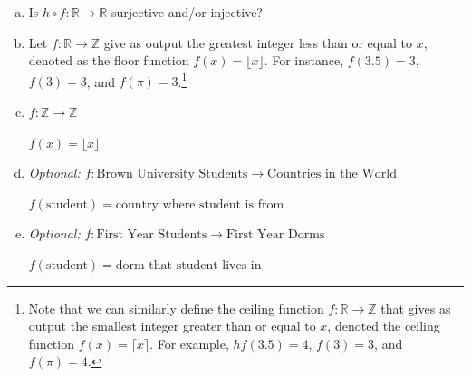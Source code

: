 \documentclass[12pt,letterpaper]{article}
\newcommand\N{\mathbb N}
\newcommand\Z{\mathbb Z}
\newcommand\R{\mathbb R}
\newif\ifsol
\newcommand{\solu}[2]{ \begin{mdframed} \ifsol #2 \else \vspace{#1} \fi \end{mdframed} }
\newcommand{\solm}[1]{\ifsol \textit{(#1)} \fi}
\begin{document}
\begin{enumerate}[a.]
        \item Is $h\circ f: \R\rightarrow \R$ surjective and/or injective?
        
        \begin{mdframed} \vspace{1cm} \end{mdframed}

        \item Let $f : \R \rightarrow \Z$
        give as output the greatest integer less than or equal to $x$, denoted as the floor function $f(x) = \lfloor x\rfloor$. For instance, $f(3.5)=3$, $f(3)=3$, and $f(\pi)=3$.\footnote{Note that we can similarly define the ceiling function $f : \R \rightarrow \Z$ that gives as output the smallest integer greater than or equal to $x$, denoted the ceiling function $f(x) = \lceil x \rceil $. For example, $hf(3.5)=4$, $f(3)=3$, and $f(\pi)=4$.}
        
        \begin{mdframed} \vspace{1cm} \end{mdframed}
 
        \item $f: \Z \rightarrow \Z$
        
        $f(x) = \lfloor x \rfloor$

        \begin{mdframed} \vspace{1cm} \end{mdframed}




        


        \item \textit{Optional:} $f : \text{Brown University Students} \rightarrow \text{Countries in the World}$

        $f(\text{student}) = \text{country where student is from}$

		\begin{mdframed} \vspace{1cm} \end{mdframed}
		
        \item \textit{Optional:} $f : \text{First Year Students} \rightarrow \text{First Year Dorms}$ 

        $f(\text{student}) = \text{dorm that student lives in}$

        \begin{mdframed} \vspace{1cm} \end{mdframed}

      \end{enumerate}
      
\end{document}
